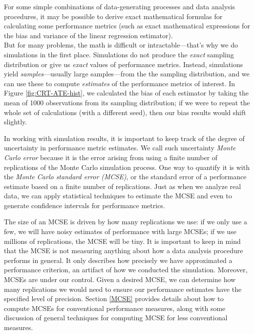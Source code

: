\documentclass[
]{book}
\begin{document}
For some simple combinations of data-generating processes and data analysis procedures, it may be possible to derive exact mathematical formulas for calculating some performance metrics (such as exact mathematical expressions for the bias and variance of the linear regression estimator).\\
But for many problems, the math is difficult or intractable---that's why we do simulations in the first place.
Simulations do not produce the \emph{exact} sampling distribution or give us \emph{exact} values of performance metrics.
Instead, simulations yield \emph{samples}---usually large samples---from the the sampling distribution, and we can use these to compute \emph{estimates} of the performance metrics of interest.
In Figure \ref{fig:CRT-ATE-hist}, we calculated the bias of each estimator by taking the mean of 1000 observations from its sampling distribution; if we were to repeat the whole set of calculations (with a different seed), then our bias results would shift slightly.

In working with simulation results, it is important to keep track of the degree of uncertainty in performance metric estimates.
We call such uncertainty \emph{Monte Carlo error} because it is the error arising from using a finite number of replications of the Monte Carlo simulation process.
One way to quantify it is with the \emph{Monte Carlo standard error (MCSE)}, or the standard error of a performance estimate based on a finite number of replications.
Just as when we analyze real data, we can apply statistical techniques to estimate the MCSE and even to generate confidence intervals for performance metrics.

The size of an MCSE is driven by how many replications we use: if we only use a few, we will have noisy estimates of performance with large MCSEs; if we use millions of replications, the MCSE will be tiny.
It is important to keep in mind that the MCSE is not measuring anything about how a data analysis procedure performs in general.
It only describes how precisely we have approximated a performance criterion, an artifact of how we conducted the simulation.
Moreover, MCSEs are under our control.
Given a desired MCSE, we can determine how many replications we would need to ensure our performance estimates have the specified level of precision.
Section \ref{MCSE} provides details about how to compute MCSEs for conventional performance measures, along with some discussion of general techniques for computing MCSE for less conventional measures.
\end{document}
